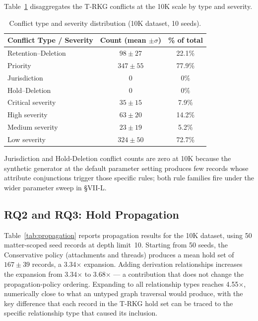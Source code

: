 \documentclass{ieeeaccess}
\begin{document}
Table~\ref{tab:typesev} disaggregates the T-RKG conflicts at the 10K scale by type and severity.

\begin{table}[t]
\centering
\caption{Conflict type and severity distribution (10K dataset, 10 seeds).}
\label{tab:typesev}
\begin{tabular}{lcc}
\hline\hline
Conflict Type / Severity & Count (mean $\pm \sigma$) & \% of total \\
\hline
Retention--Deletion & $98 \pm 27$  & 22.1\% \\
Priority            & $347 \pm 55$ & 77.9\% \\
Jurisdiction        & 0            & 0\% \\
Hold--Deletion      & 0            & 0\% \\
\hline
Critical severity   & $35 \pm 15$  & 7.9\% \\
High severity       & $63 \pm 20$  & 14.2\% \\
Medium severity     & $23 \pm 19$  & 5.2\% \\
Low severity        & $324 \pm 50$ & 72.7\% \\
\hline\hline
\end{tabular}
\end{table}

Jurisdiction and Hold-Deletion conflict counts are zero at 10K because the synthetic generator at the default parameter setting produces few records whose attribute conjunctions trigger those specific rules; both rule families fire under the wider parameter sweep in §VII-L.

\subsection{RQ2 and RQ3: Hold Propagation}

Table~\ref{tab:propagation} reports propagation results for the 10K dataset, using 50 matter-scoped seed records at depth limit~10. Starting from 50 seeds, the Conservative policy (attachments and threads) produces a mean hold set of $167 \pm 39$ records, a 3.34$\times$ expansion. Adding derivation relationships increases the expansion from 3.34$\times$ to 3.68$\times$ --- a contribution that does not change the propagation-policy ordering. Expanding to all relationship types reaches 4.55$\times$, numerically close to what an untyped graph traversal would produce, with the key difference that each record in the T-RKG hold set can be traced to the specific relationship type that caused its inclusion.
\end{document}

